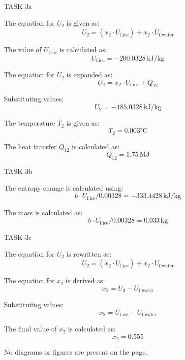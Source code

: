 TASK 3a  

The equation for \( U_2 \) is given as:  
\[
U_2 = (x_2 \cdot U_{\text{f,ice}}) + x_2 \cdot U_{\text{f,water}}
\]  

The value of \( U_{\text{f,ice}} \) is calculated as:  
\[
U_{\text{f,ice}} = -200.0328 \, \text{kJ/kg}
\]  

The equation for \( U_2 \) is expanded as:  
\[
U_2 = x_2 \cdot U_{\text{f,ice}} + Q_{12}
\]  

Substituting values:  
\[
U_2 = -185.0328 \, \text{kJ/kg}
\]  

The temperature \( T_2 \) is given as:  
\[
T_2 = 0.003^\circ \text{C}
\]  

The heat transfer \( Q_{12} \) is calculated as:  
\[
Q_{12} = 1.75 \, \text{MJ}
\]  

TASK 3b  

The entropy change is calculated using:  
\[
b \cdot U_{\text{f,ice}} / 0.00328 = -333.4428 \, \text{kJ/kg}
\]  

The mass is calculated as:  
\[
b \cdot U_{\text{f,ice}} / 0.00328 = 0.033 \, \text{kg}
\]  

TASK 3c  

The equation for \( U_2 \) is rewritten as:  
\[
U_2 = (x_2 \cdot U_{\text{f,ice}}) + x_2 \cdot U_{\text{f,water}}
\]  

The equation for \( x_2 \) is derived as:  
\[
x_2 = U_2 - U_{\text{f,water}}
\]  

Substituting values:  
\[
x_2 = U_{\text{f,ice}} - U_{\text{f,water}}
\]  

The final value of \( x_2 \) is calculated as:  
\[
x_2 = 0.555
\]  

No diagrams or figures are present on the page.